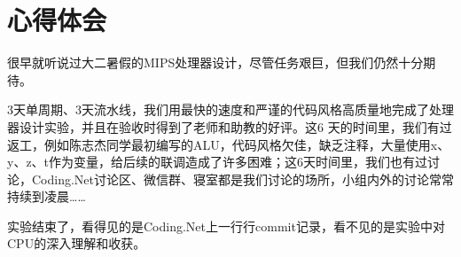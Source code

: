 \documentclass{article}
\begin{document}
    \section{心得体会}
        很早就听说过大二暑假的MIPS处理器设计，尽管任务艰巨，但我们仍然十分期待。

        3天单周期、3天流水线，我们用最快的速度和严谨的代码风格高质量地完成了处理器设计实验，并且在验收时得到了老师和助教的好评。这6 天的时间里，我们有过返工，例如陈志杰同学最初编写的ALU，代码风格欠佳，缺乏注释，大量使用x、y、z、t作为变量，给后续的联调造成了许多困难；这6天时间里，我们也有过讨论，Coding.Net讨论区、微信群、寝室都是我们讨论的场所，小组内外的讨论常常持续到凌晨……

        实验结束了，看得见的是Coding.Net上一行行commit记录，看不见的是实验中对CPU的深入理解和收获。
\end{document}
